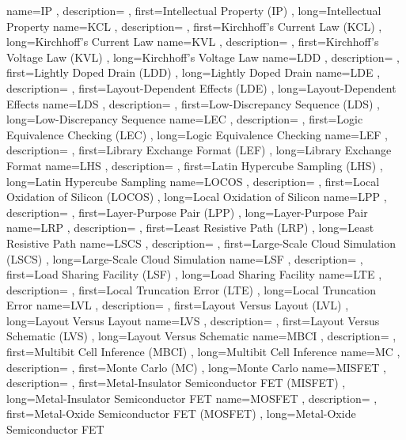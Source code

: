 { name={IP}
, description={}
, first={Intellectual Property (IP)}
, long={Intellectual Property}
}
{ name={KCL}
, description={}
, first={Kirchhoff’s Current Law (KCL)}
, long={Kirchhoff’s Current Law}
}
{ name={KVL}
, description={}
, first={Kirchhoff’s Voltage Law (KVL)}
, long={Kirchhoff’s Voltage Law}
}
{ name={LDD}
, description={}
, first={Lightly Doped Drain (LDD)}
, long={Lightly Doped Drain}
}
{ name={LDE}
, description={}
, first={Layout-Dependent Effects (LDE)}
, long={Layout-Dependent Effects}
}
{ name={LDS}
, description={}
, first={Low-Discrepancy Sequence (LDS)}
, long={Low-Discrepancy Sequence}
}
{ name={LEC}
, description={}
, first={Logic Equivalence Checking (LEC)}
, long={Logic Equivalence Checking}
}
{ name={LEF}
, description={}
, first={Library Exchange Format (LEF)}
, long={Library Exchange Format}
}
{ name={LHS}
, description={}
, first={Latin Hypercube Sampling (LHS)}
, long={Latin Hypercube Sampling}
}
{ name={LOCOS}
, description={}
, first={Local Oxidation of Silicon (LOCOS)}
, long={Local Oxidation of Silicon}
}
{ name={LPP}
, description={}
, first={Layer-Purpose Pair (LPP)}
, long={Layer-Purpose Pair}
}
{ name={LRP}
, description={}
, first={Least Resistive Path (LRP)}
, long={Least Resistive Path}
}
{ name={LSCS}
, description={}
, first={Large-Scale Cloud Simulation (LSCS)}
, long={Large-Scale Cloud Simulation}
}
{ name={LSF}
, description={}
, first={Load Sharing Facility (LSF)}
, long={Load Sharing Facility}
}
{ name={LTE}
, description={}
, first={Local Truncation Error (LTE)}
, long={Local Truncation Error}
}
{ name={LVL}
, description={}
, first={Layout Versus Layout (LVL)}
, long={Layout Versus Layout}
}
{ name={LVS}
, description={}
, first={Layout Versus Schematic (LVS)}
, long={Layout Versus Schematic}
}
{ name={MBCI}
, description={}
, first={Multibit Cell Inference (MBCI)}
, long={Multibit Cell Inference}
}
{ name={MC}
, description={}
, first={Monte Carlo (MC)}
, long={Monte Carlo}
}
{ name={MISFET}
, description={}
, first={Metal-Insulator Semiconductor FET (MISFET)}
, long={Metal-Insulator Semiconductor FET}
}
{ name={MOSFET}
, description={}
, first={Metal-Oxide Semiconductor FET (MOSFET)}
, long={Metal-Oxide Semiconductor FET}
}
